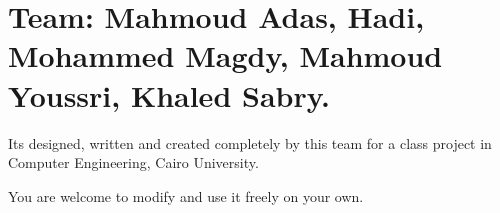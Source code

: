 \section*{Team\+: Mahmoud Adas, Hadi, Mohammed Magdy, Mahmoud Youssri, Khaled Sabry.}

It\textquotesingle{}s designed, written and created completely by this team for a class project in Computer Engineering, Cairo University.

You are welcome to modify and use it freely on your own. 